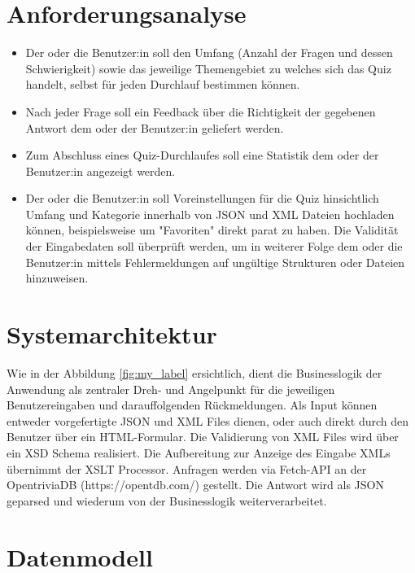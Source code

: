 \documentclass[a4paper]{article}
\begin{document}
\section{Anforderungsanalyse}

\begin{itemize}
  \item Der oder die Benutzer:in soll den Umfang (Anzahl der Fragen und dessen Schwierigkeit) sowie das jeweilige Themengebiet zu welches sich das Quiz handelt, selbst für jeden Durchlauf bestimmen können. 
  \item Nach jeder Frage soll ein Feedback über die Richtigkeit der gegebenen Antwort dem oder der Benutzer:in geliefert werden.
  \item Zum Abschluss eines Quiz-Durchlaufes soll eine Statistik dem oder der Benutzer:in angezeigt werden.
  \item Der oder die Benutzer:in soll Voreinstellungen für die Quiz hinsichtlich Umfang und Kategorie innerhalb von JSON und XML Dateien hochladen können, beispielsweise um "Favoriten" direkt parat zu haben. Die Validität der Eingabedaten soll überprüft werden, um in weiterer Folge dem oder die Benutzer:in mittels Fehlermeldungen auf ungültige Strukturen oder Dateien hinzuweisen.
\end{itemize}

\section{Systemarchitektur}
Wie in der Abbildung \ref{fig:my_label} ersichtlich, dient die Businesslogik der Anwendung als zentraler Dreh- und Angelpunkt für die jeweiligen Benutzereingaben und darauffolgenden Rückmeldungen. Als Input können entweder vorgefertigte JSON und XML Files dienen, oder auch direkt durch den Benutzer über ein HTML-Formular. Die Validierung von XML Files wird über ein XSD Schema realisiert. Die Aufbereitung zur Anzeige des Eingabe XMLs übernimmt der XSLT Processor. Anfragen werden via Fetch-API an der OpentriviaDB (https://opentdb.com/) gestellt. Die Antwort wird als JSON geparsed und wiederum von der Businesslogik weiterverarbeitet.

\clearpage

\section{Datenmodell}
\end{document}
